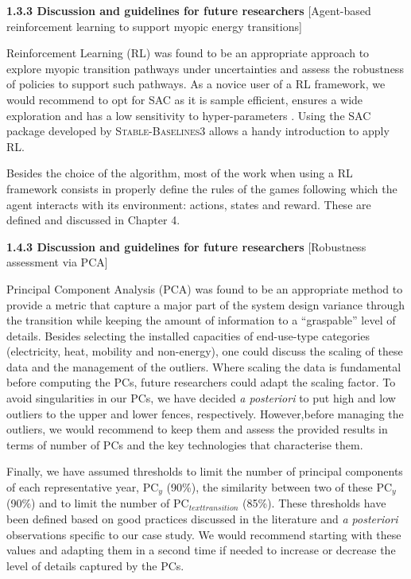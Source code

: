 \documentclass[12pt,a4paper]{article}
\begin{document}
\begin{mdframed}[style=manuscript]
\textbf{1.3.3 Discussion and guidelines for future researchers} [Agent-based reinforcement learning to support myopic energy transitions]

Reinforcement Learning (RL) was found to be an appropriate approach to explore myopic transition pathways under uncertainties and assess the robustness of policies to support such pathways. As a novice user of a RL framework, we would recommend to opt for SAC as it is sample efficient, ensures a wide exploration and has a low sensitivity to hyper-parameters \cite{haarnoja2018soft}. Using the SAC package developed by \textsc{Stable-Baselines3} allows a handy introduction to apply RL. 

Besides the choice of the algorithm, most of the work when using a RL framework consists in properly define the rules of the games following which the agent interacts with its environment: actions, states and reward. These are defined and discussed in Chapter 4.
\end{mdframed}

\begin{mdframed}[style=manuscript]
\textbf{1.4.3 Discussion and guidelines for future researchers} [Robustness assessment via PCA]

Principal Component Analysis (PCA) was found to be an appropriate method to provide a metric that capture a major part of the system design variance through the transition while keeping the amount of information to a ``graspable'' level of details. Besides selecting the installed capacities of end-use-type categories (electricity, heat, mobility and non-energy), one could discuss the scaling of these data and the management of the outliers. Where scaling the data is fundamental before computing the PCs, future researchers could adapt the scaling factor. To avoid singularities in our PCs, we have decided \textit{a posteriori} to put high and low outliers to the upper and lower fences, respectively. However,before managing the outliers, we would recommend to keep them and assess the provided results in terms of number of PCs and the key technologies that characterise them.

Finally, we have assumed thresholds to limit the number of principal components of each representative year, $\text{PC}_y$ (90\%), the similarity between two of these $\text{PC}_y$ (90\%) and to limit the number of $\text{PC}_{text{transition}}$ (85\%). These thresholds have been defined based on good practices discussed in the literature and \textit{a posteriori} observations specific to our case study. We would recommend starting with these values and adapting them in a second time if needed to increase or decrease the level of details captured by the PCs.
\end{mdframed}
\end{document}

